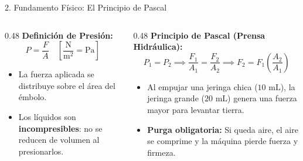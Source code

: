 \documentclass[
  spanish,
  aspectratio=169,
  xcolor={dvipsnames,table}
]{beamer}
\begin{document}
\begin{frame}{2. Fundamento Físico: El Principio de Pascal}
  \begin{columns}[T]
    \begin{column}{0.48\textwidth}
      \textbf{\color{uanlblue}Definición de Presión:}
      $$P = \frac{F}{A} \quad \left[\frac{\text{N}}{\text{m}^2} = \text{Pa}\right]$$
      \begin{itemize}
        \item La fuerza aplicada se distribuye sobre el área del émbolo.
        \item Los líquidos son \textbf{incompresibles}: no se reducen de volumen al presionarlos.
      \end{itemize}
    \end{column}
    \begin{column}{0.48\textwidth}
      \textbf{\color{uanlblue}Principio de Pascal (Prensa Hidráulica):}
      $$P_1 = P_2 \implies \frac{F_1}{A_1} = \frac{F_2}{A_2} \implies F_2 = F_1 \left(\frac{A_2}{A_1}\right)$$
      \begin{itemize}
        \item Al empujar una jeringa chica ($10\text{ mL}$), la jeringa grande ($20\text{ mL}$) genera una fuerza mayor para levantar tierra.
        \item \textbf{Purga obligatoria:} Si queda aire, el aire se comprime y la máquina pierde fuerza y firmeza.
      \end{itemize}
    \end{column}
  \end{columns}
\end{frame}
\end{document}
